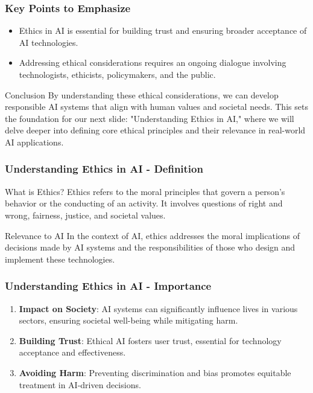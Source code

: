 \documentclass{beamer}
\begin{document}
\begin{frame}[fragile]
    \frametitle{Key Points to Emphasize}
    
    \begin{itemize}
        \item Ethics in AI is essential for building trust and ensuring broader acceptance of AI technologies.
        \item Addressing ethical considerations requires an ongoing dialogue involving technologists, ethicists, policymakers, and the public.
    \end{itemize}

    \begin{block}{Conclusion}
        By understanding these ethical considerations, we can develop responsible AI systems that align with human values and societal needs. This sets the foundation for our next slide: "Understanding Ethics in AI," where we will delve deeper into defining core ethical principles and their relevance in real-world AI applications.
    \end{block}
\end{frame}

\begin{frame}[fragile]
    \frametitle{Understanding Ethics in AI - Definition}
    \begin{block}{What is Ethics?}
        Ethics refers to the moral principles that govern a person's behavior or the conducting of an activity. It involves questions of right and wrong, fairness, justice, and societal values.
    \end{block}
    
    \begin{block}{Relevance to AI}
        In the context of AI, ethics addresses the moral implications of decisions made by AI systems and the responsibilities of those who design and implement these technologies.
    \end{block}
\end{frame}

\begin{frame}[fragile]
    \frametitle{Understanding Ethics in AI - Importance}
    \begin{enumerate}
        \item \textbf{Impact on Society}: AI systems can significantly influence lives in various sectors, ensuring societal well-being while mitigating harm.
        \item \textbf{Building Trust}: Ethical AI fosters user trust, essential for technology acceptance and effectiveness.
        \item \textbf{Avoiding Harm}: Preventing discrimination and bias promotes equitable treatment in AI-driven decisions.
    \end{enumerate}
\end{frame}
\end{document}
